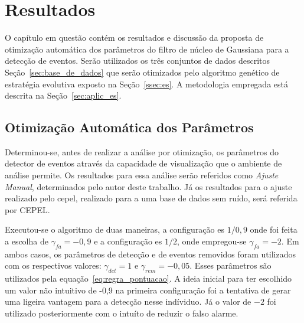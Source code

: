 \chapter{Resultados}
\label{chap:resultados}

O capítulo em questão contém os resultados e discussão da proposta de
otimização automática dos parâmetros do filtro de núcleo de Gaussiana
para a
detecção de eventos. %
Serão utilizados os três
conjuntos de dados descritos Seção~\ref{sec:base_de_dados} que serão
otimizados pelo algoritmo genético de estratégia evolutiva exposto na
Seção~\ref{ssec:es}. A metodologia empregada está descrita na
Seção~\ref{sec:aplic_es}. 

\section{Otimização Automática dos Parâmetros}
\label{sec:otim_es}

Determinou-se, antes de realizar a análise por otimização, os
parâmetros do detector de eventos através da capacidade de
visualização que o ambiente de análise permite. Os resultados para
essa análise serão referidos como \emph{Ajuste Manual}, determinados
pelo autor deste trabalho. Já os resultados para o ajuste realizado
pelo \acs{cepel}, realizado para a uma base de dados sem ruído, será
referida por CEPEL.

Executou-se o algoritmo de duas maneiras, a configuração \acs{es} $1/0,9$
onde foi feita a escolha de $\gamma_{fa}=-0,9$ e a configuração
\acs{es} $1/2$, onde empregou-se $\gamma_{fa}=-2$. Em ambos casos, os
parâmetros de detecção e de eventos removidos foram utilizados com os
respectivos valores: $\gamma_{det}=1$ e $\gamma_{rem}=-0,05$. Esses
parâmetros são utilizados pela equação~\ref{eq:regra_pontuacao}. A
ideia inicial para ter escolhido um valor não intuitivo de -0,9 na
primeira configuração foi a tentativa de gerar uma ligeira vantagem para
a detecção nesse indíviduo. Já o valor de $-2$ foi utilizado
posteriormente com o intuíto de reduzir o falso alarme. 

